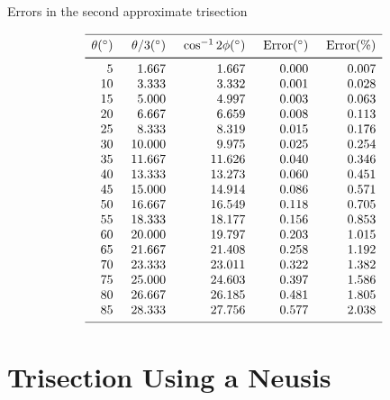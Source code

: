 \begin{table}[t]
\caption{Errors in the second approximate trisection}\label{t.trisect-second-approx}
\[
%
\begin{array}{r@{\hspace{5mm}}r@{\hspace{5mm}}r@{\hspace{5mm}}r@{\hspace{5mm}}r}
\hline
\noalign{\smallskip}
\theta ({}^\circ) & \theta/3 ({}^\circ)& \cos^{-1} 2\phi ({}^\circ) & \mathrm{Error} ({}^\circ) & \mathrm{Error (\%)}\\
\noalign{\smallskip}\svhline\noalign{\smallskip}
  5 &    1.667 &    1.667  &     0.000 &    0.007 \\
 10 &    3.333 &    3.332  &     0.001 &    0.028 \\
 15 &    5.000 &    4.997  &     0.003 &    0.063 \\
 20 &    6.667 &    6.659  &     0.008 &    0.113 \\
 25 &    8.333 &    8.319  &     0.015 &    0.176 \\
 30 &   10.000 &    9.975  &     0.025 &    0.254 \\
 35 &   11.667 &   11.626  &     0.040 &    0.346 \\
 40 &   13.333 &   13.273  &     0.060 &    0.451 \\
 45 &   15.000 &   14.914  &     0.086 &    0.571 \\
 50 &   16.667 &   16.549  &     0.118 &    0.705 \\
 55 &   18.333 &   18.177  &     0.156 &    0.853 \\
 60 &   20.000 &   19.797  &     0.203 &    1.015 \\
 65 &   21.667 &   21.408  &     0.258 &    1.192 \\
 70 &   23.333 &   23.011  &     0.322 &    1.382 \\
 75 &   25.000 &   24.603  &     0.397 &    1.586 \\
 80 &   26.667 &   26.185  &     0.481 &    1.805 \\
 85 &   28.333 &   27.756  &     0.577 &    2.038 \\
 \noalign{\smallskip}
 \hline
 \end{array}
\]
\end{table}



\section{Trisection Using a Neusis}\label{s.neusis}

